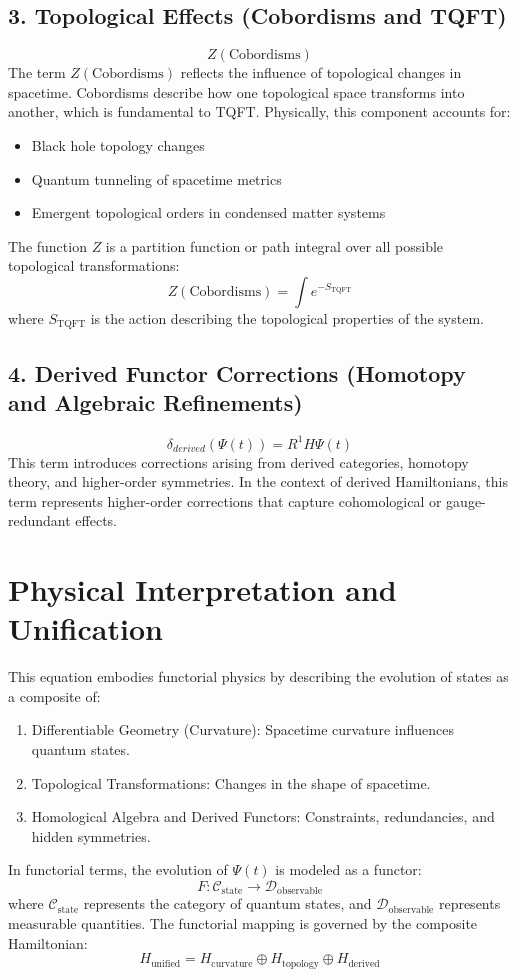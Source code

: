 \documentclass[12pt]{article}
\begin{document}
\subsection{3. Topological Effects (Cobordisms and TQFT)}
\[
Z(\text{Cobordisms})
\]
The term \( Z(\text{Cobordisms}) \) reflects the influence of topological changes in spacetime. Cobordisms describe how one topological space transforms into another, which is fundamental to TQFT. Physically, this component accounts for:
\begin{itemize}
    \item Black hole topology changes
    \item Quantum tunneling of spacetime metrics
    \item Emergent topological orders in condensed matter systems
\end{itemize}
The function \( Z \) is a partition function or path integral over all possible topological transformations:
\[
Z(\text{Cobordisms}) = \int e^{-S_{\text{TQFT}}}
\]
where \( S_{\text{TQFT}} \) is the action describing the topological properties of the system.

\subsection{4. Derived Functor Corrections (Homotopy and Algebraic Refinements)}
\[
\delta_{derived}(\Psi(t)) = R^1 H \Psi(t)
\]
This term introduces corrections arising from derived categories, homotopy theory, and higher-order symmetries. In the context of derived Hamiltonians, this term represents higher-order corrections that capture cohomological or gauge-redundant effects.

\section{Physical Interpretation and Unification}
This equation embodies functorial physics by describing the evolution of states as a composite of:
\begin{enumerate}
    \item Differentiable Geometry (Curvature): Spacetime curvature influences quantum states.
    \item Topological Transformations: Changes in the shape of spacetime.
    \item Homological Algebra and Derived Functors: Constraints, redundancies, and hidden symmetries.
\end{enumerate}
In functorial terms, the evolution of \( \Psi(t) \) is modeled as a functor:
\[
F : \mathcal{C}_{\text{state}} \to \mathcal{D}_{\text{observable}}
\]
where \( \mathcal{C}_{\text{state}} \) represents the category of quantum states, and \( \mathcal{D}_{\text{observable}} \) represents measurable quantities. The functorial mapping is governed by the composite Hamiltonian:
\[
H_{\text{unified}} = H_{\text{curvature}} \oplus H_{\text{topology}} \oplus H_{\text{derived}}
\]
\end{document}
